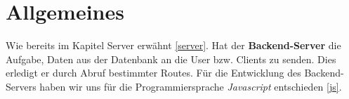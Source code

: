 \chapter{Allgemeines}

Wie bereits im Kapitel Server erwähnt \ref{server}. Hat der \textbf{Backend-Server} die Aufgabe,
Daten aus der Datenbank an die User bzw. Clients zu senden. Dies erledigt er durch Abruf
bestimmter Routes. Für die Entwicklung des Backend-Servers haben wir uns für die Programmiersprache
\textit{Javascript} entschieden \ref{js}.




